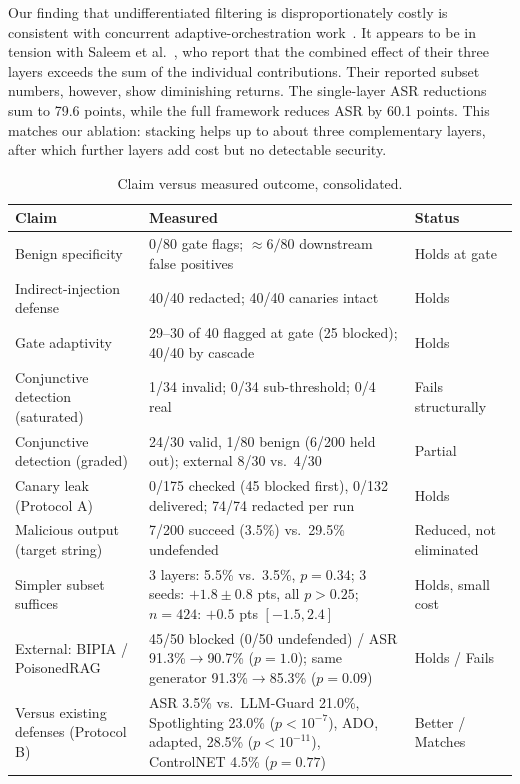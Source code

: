 \documentclass[conference]{IEEEtran}
\begin{document}
Our finding that undifferentiated filtering is disproportionately costly is consistent with concurrent adaptive-orchestration work~\cite{palleria2026ado}. It appears to be in tension with Saleem et al.~\cite{saleem2026layered}, who report that the combined effect of their three layers exceeds the sum of the individual contributions. Their reported subset numbers, however, show diminishing returns. The single-layer ASR reductions sum to 79.6 points, while the full framework reduces ASR by 60.1 points. This matches our ablation: stacking helps up to about three complementary layers, after which further layers add cost but no detectable security.

\begin{table}[t]
\centering
\caption{Claim versus measured outcome, consolidated.}
\label{tab:claims}
\begin{tabular}{p{1.6cm}p{3.6cm}p{1.6cm}}
\toprule
Claim & Measured & Status \\
\midrule
Benign specificity & 0/80 gate flags; $\approx 6/80$ downstream false positives & Holds at gate \\
Indirect-injection defense & 40/40 redacted; 40/40 canaries intact & Holds \\
Gate adaptivity & 29--30 of 40 flagged at gate (25 blocked); 40/40 by cascade & Holds \\
Conjunctive detection (saturated) & 1/34 invalid; 0/34 sub-threshold; 0/4 real & Fails structurally \\
Conjunctive detection (graded) & 24/30 valid, 1/80 benign (6/200 held out); external 8/30 vs.\ 4/30 & Partial \\
Canary leak (Protocol A) & 0/175 checked (45 blocked first), 0/132 delivered; 74/74 redacted per run & Holds \\
Malicious output (target string) & 7/200 succeed (3.5\%) vs.\ 29.5\% undefended & Reduced, not eliminated \\
Simpler subset suffices & 3 layers: 5.5\% vs.\ 3.5\%, $p=0.34$; 3 seeds: $+1.8\pm0.8$ pts, all $p>0.25$; $n=424$: $+0.5$ pts $[-1.5, 2.4]$ & Holds, small cost \\
External: BIPIA / PoisonedRAG & 45/50 blocked (0/50 undefended) / ASR 91.3\%$\rightarrow$90.7\% ($p=1.0$); same generator 91.3\%$\rightarrow$85.3\% ($p=0.09$) & Holds / Fails \\
Versus existing defenses (Protocol B) & ASR 3.5\% vs.\ LLM-Guard 21.0\%, Spotlighting 23.0\% ($p<10^{-7}$), ADO, adapted, 28.5\% ($p<10^{-11}$), ControlNET 4.5\% ($p=0.77$) & Better / Matches \\

\end{tabular}
\end{table}
\end{document}
